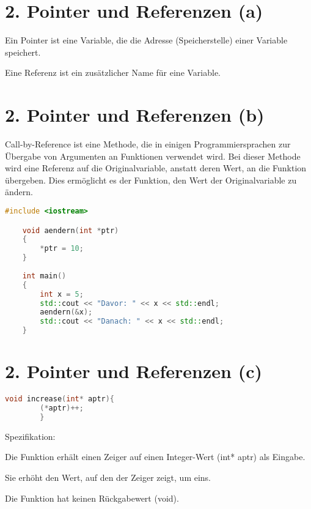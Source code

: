 \documentclass{article}
\begin{document}
\section*{2. Pointer und Referenzen (a)}

Ein Pointer ist eine Variable, die die Adresse (Speicherstelle) einer Variable speichert.

Eine Referenz ist ein zusätzlicher Name für eine Variable.

\section*{2. Pointer und Referenzen (b)}

Call-by-Reference ist eine Methode, die in einigen Programmiersprachen zur Übergabe von Argumenten an Funktionen verwendet wird. Bei dieser Methode wird eine Referenz auf die Originalvariable, anstatt deren Wert, an die Funktion übergeben. Dies ermöglicht es der Funktion, den Wert der Originalvariable zu ändern.

\vspace*{0.5cm}


\begin{lstlisting}[language=C++]
    #include <iostream>

    void aendern(int *ptr)
    {
        *ptr = 10;
    }
    
    int main()
    {
        int x = 5;
        std::cout << "Davor: " << x << std::endl;
        aendern(&x);
        std::cout << "Danach: " << x << std::endl;
    }
\end{lstlisting}

\section*{2. Pointer und Referenzen (c)}

\begin{lstlisting}[language=C++]
    void increase(int* aptr){
        (*aptr)++;
        }
\end{lstlisting}

\vspace*{0.5cm}


Spezifikation:

Die Funktion erhält einen Zeiger auf einen Integer-Wert (int* aptr) als Eingabe.

Sie erhöht den Wert, auf den der Zeiger zeigt, um eins.

Die Funktion hat keinen Rückgabewert (void).
\end{document}
